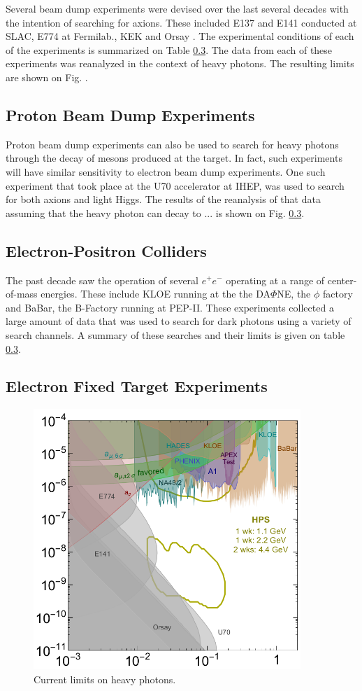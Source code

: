 Several beam dump experiments were devised over the last several decades with
the intention of searching for axions.  These included E137 \cite{PhysRevD.38.3375}
and E141 \cite{PhysRevLett.59.755} conducted at SLAC, E774 \cite{} at Fermilab., 
KEK \cite{} and Orsay \cite{}. The experimental conditions of each of the 
experiments is summarized on Table \ref{}. The data from each of these 
experiments was reanalyzed in the context of heavy photons.  The resulting limits
are shown on Fig. .

\subsection{Proton Beam Dump Experiments}

Proton beam dump experiments can also be used to search for heavy photons
through the decay of mesons produced at the target.  In fact, such experiments
will have similar sensitivity to electron beam dump experiments.  One such 
experiment that took place at the U70 accelerator at IHEP, was used to search
for both axions and light Higgs.  The results of the reanalysis of that data
assuming that the heavy photon can decay to ... is shown on Fig. \ref{}.

\subsection{Electron-Positron Colliders}

The past decade saw the operation of several $e^+e^-$ operating at a range of 
center-of-mass energies.  These include KLOE running at the the DA$\Phi$NE, 
the $\phi$ factory and BaBar, the B-Factory running at PEP-II.   These 
experiments collected a large amount of data that was used to search for 
dark photons using a variety of search channels.  A summary of these searches
and their limits is given on table \ref{}.

\subsection{Electron Fixed Target Experiments}

\begin{figure}[t]
    \centering
    \includegraphics[width=0.9\textwidth]{images/ap_current_limits.png}
    \caption{Current limits on heavy photons.}
    \label{fig:svt_layout_render}
\end{figure}
